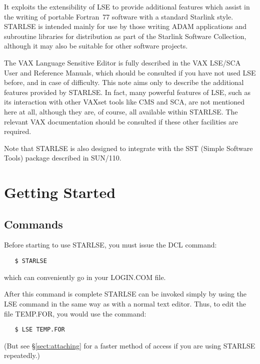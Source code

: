 It exploits the extensibility of \mbox{LSE} to provide additional features which
assist in the writing of portable Fortran~77 software with a standard Starlink
style. 
\mbox{STARLSE} is intended mainly for use by those writing \mbox{ADAM}
applications and subroutine libraries for distribution as part of the Starlink
Software Collection, although it may also be suitable for other software
projects. 

The \mbox{VAX} Language Sensitive Editor is fully described in the
\mbox{VAX} \mbox{LSE/SCA} User and Reference Manuals, which should be
consulted if you have not used \mbox{LSE} before, and in case of difficulty.
This note aims only to describe the additional features provided by
\mbox{STARLSE}. 
In fact, many powerful features of \mbox{LSE}, such as its interaction with
other VAXset tools like \mbox{CMS} and \mbox{SCA}, are not mentioned here at
all, although they are, of course, all available within \mbox{STARLSE}. 
The relevant \mbox{VAX} documentation should be consulted if these other
facilities are required.

Note that STARLSE is also designed to integrate with the SST (Simple
Software Tools) package described in SUN/110. 


\section{Getting Started}

\subsection{Commands}
\label{sect:starting}
Before starting to use \mbox{STARLSE}, you must issue the DCL command:

\begin{verbatim}
   $ STARLSE
\end{verbatim}

which can conveniently go in your \mbox{LOGIN.COM} file.

After this command is complete \mbox{STARLSE} can be invoked simply by using the
\mbox{LSE} command in the same way as with a normal text editor. Thus, to edit
the file \mbox{TEMP.FOR}, you would use the command:

\begin{verbatim}
   $ LSE TEMP.FOR
\end{verbatim}

(But see \S\ref{sect:attaching} for a faster method of access if you are using
STARLSE repeatedly.)


